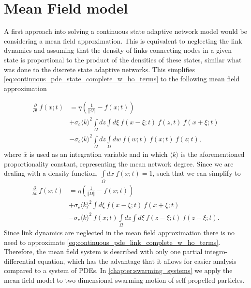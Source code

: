 


\section{Mean Field model}
A first approach into solving a continuous state adaptive network model would be considering a mean field approximation. This is equivalent to neglecting the link dynamics and assuming that the density of links connecting nodes in a given state is proportional to the product of the densities of these states, similar what was done to the discrete state adaptive networks. This simplifies \cref{eq:continuous_pde_state_complete_w_ho_terms} to the following mean field approximation 


\begin{equation}
\begin{aligned}
\frac{\partial}{\partial t}\ f(x;t) &= 
\eta \left( \frac{1}{\Vert \Omega \Vert} - f(x;t) \right) \\ 
&+ \sigma_c\langle k \rangle^2 \int\limits_{\Omega} dz \int\limits d\xi\
f(x-\xi;t)\ f(z,t)\ f(x+\xi;t) \\
&- \sigma_c \langle k \rangle^2 \int\limits_{\Omega} dz  \int\limits_{\Omega} dw\ f(w;t)\ f(x;t)\ f(z;t),
\end{aligned}
\end{equation}
where $\bar{x}$ is used as an integration variable and in which $\langle k \rangle$ is the aforementioned proportionality constant, representing the mean network degree. Since we are dealing with a density function, $\int\limits_{\Omega} dx\ f(x;t) =1$, such that we can simplify to
\begin{equation}
\begin{aligned}
\frac{\partial}{\partial t}\ f(x;t) &= 
\eta \left( \frac{1}{\Vert \Omega \Vert} - f(x;t) \right) \\
&	+ \sigma_c\langle k \rangle^2  \int\limits d\xi\
f(x-\xi;t)\ f(x+\xi;t) \\
&	- \sigma_c \langle k \rangle^2\ f(x;t) \int\limits_{\Omega} dz \int\limits d\xi\ f(z-\xi;t)\ f(z+\xi;t).
\end{aligned}
\label{eq:cont_state_mean_field}
\end{equation}
Since link dynamics are neglected in the mean field approximation there is no need to approximate \cref{eq:continuous_pde_link_complete_w_ho_terms}. Therefore, the mean field system is described with only one partial integro-differential equation, which has the advantage that it allows for easier analysis compared to a system of PDEs. In \cref{chapter:swarming_systems} we apply the mean field model to two-dimensional swarming motion of self-propelled particles.

